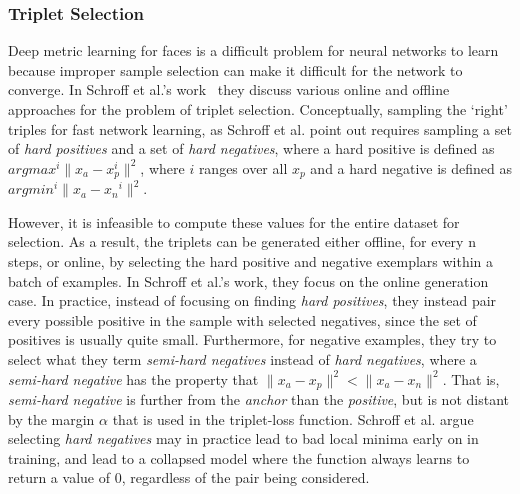\subsubsection{Triplet Selection}
Deep metric learning for faces is a difficult problem for neural networks to learn because improper sample selection can make it difficult for the network to converge.  In Schroff et al.'s work~\cite{DBLP:conf/cvpr/SchroffKP15} they discuss various online and offline approaches for the problem of triplet selection.  Conceptually, sampling the `right' triples for fast network learning, as Schroff et al. point out requires sampling a set of \textit{hard positives} and a set of \textit{hard negatives}, where a hard positive is defined as $argmax^i \| x_{a} - x_{p}^i \|^2$, where $i$ ranges over all $x_p$ and a hard negative is defined as $argmin^i \| x_{a} - x{_n}^i \|^2$.  

However, it is infeasible to compute these values for the entire dataset for selection.  As a result, the triplets can be generated either offline, for every n steps, or online, by selecting the hard positive and negative exemplars within a batch of examples.  In Schroff et al.'s work, they focus on the online generation case.  In practice, instead of focusing on finding \textit{hard positives}, they instead pair every possible positive in the sample with selected negatives, since the set of positives is usually quite small.  Furthermore, for negative examples, they try to select what they term \textit{semi-hard negatives} instead of \textit{hard negatives}, where a \textit{semi-hard negative} has the property that $\|x_a - x_p \|^2 < \|x_a - x_n \|^2$.  That is, \textit{semi-hard negative} is further from the \textit{anchor} than the \textit{positive}, but is not distant by the margin $\alpha$ that is used in the triplet-loss function.  Schroff et al. argue selecting \textit{hard negatives} may in practice lead to bad local minima early on in training, and lead to a collapsed model where the function always learns to return a value of 0, regardless of the pair being considered.

